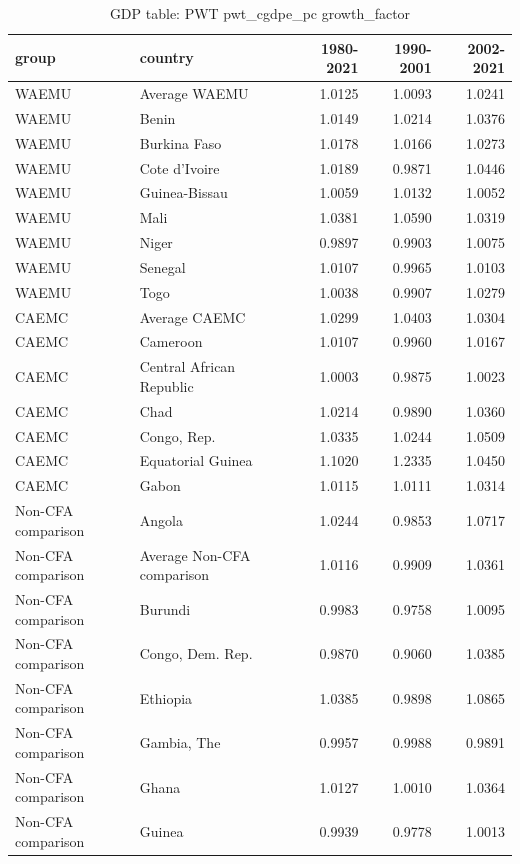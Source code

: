 \begin{table}

\caption{GDP table: PWT pwt_cgdpe_pc growth_factor}
\centering
\begin{tabular}[t]{llrrr}
\toprule
group & country & 1980-2021 & 1990-2001 & 2002-2021\\
\midrule
WAEMU & Average WAEMU & 1.0125 & 1.0093 & 1.0241\\
WAEMU & Benin & 1.0149 & 1.0214 & 1.0376\\
WAEMU & Burkina Faso & 1.0178 & 1.0166 & 1.0273\\
WAEMU & Cote d'Ivoire & 1.0189 & 0.9871 & 1.0446\\
WAEMU & Guinea-Bissau & 1.0059 & 1.0132 & 1.0052\\
\addlinespace
WAEMU & Mali & 1.0381 & 1.0590 & 1.0319\\
WAEMU & Niger & 0.9897 & 0.9903 & 1.0075\\
WAEMU & Senegal & 1.0107 & 0.9965 & 1.0103\\
WAEMU & Togo & 1.0038 & 0.9907 & 1.0279\\
CAEMC & Average CAEMC & 1.0299 & 1.0403 & 1.0304\\
\addlinespace
CAEMC & Cameroon & 1.0107 & 0.9960 & 1.0167\\
CAEMC & Central African Republic & 1.0003 & 0.9875 & 1.0023\\
CAEMC & Chad & 1.0214 & 0.9890 & 1.0360\\
CAEMC & Congo, Rep. & 1.0335 & 1.0244 & 1.0509\\
CAEMC & Equatorial Guinea & 1.1020 & 1.2335 & 1.0450\\
\addlinespace
CAEMC & Gabon & 1.0115 & 1.0111 & 1.0314\\
Non-CFA comparison & Angola & 1.0244 & 0.9853 & 1.0717\\
Non-CFA comparison & Average Non-CFA comparison & 1.0116 & 0.9909 & 1.0361\\
Non-CFA comparison & Burundi & 0.9983 & 0.9758 & 1.0095\\
Non-CFA comparison & Congo, Dem. Rep. & 0.9870 & 0.9060 & 1.0385\\
\addlinespace
Non-CFA comparison & Ethiopia & 1.0385 & 0.9898 & 1.0865\\
Non-CFA comparison & Gambia, The & 0.9957 & 0.9988 & 0.9891\\
Non-CFA comparison & Ghana & 1.0127 & 1.0010 & 1.0364\\
Non-CFA comparison & Guinea & 0.9939 & 0.9778 & 1.0013\\

\end{tabular}
\end{table}
